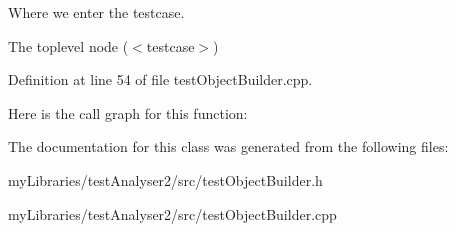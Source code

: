 Where we enter the testcase. 

The toplevel node ($<$testcase$>$) 

Definition at line 54 of file test\+Object\+Builder.\+cpp.

Here is the call graph for this function\+:


The documentation for this class was generated from the following files\+:\begin{DoxyCompactItemize}
\item 
my\+Libraries/test\+Analyser2/src/test\+Object\+Builder.\+h\item 
my\+Libraries/test\+Analyser2/src/test\+Object\+Builder.\+cpp\end{DoxyCompactItemize}
